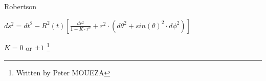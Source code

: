 \documentclass{article}
\date{1st february 1966}
\begin{document}





Robertson



$ds^2 = dt^2-R^2(t)[\frac{dr^2}{1-K \cdot r^2}+r^2 \cdot (d\theta^2+sin(\theta)^2 \cdot d\phi ^2)] \quad$

$K=0$  or  $ \SI{  \pm 1}{ } $
\footnote{Written by Peter MOUEZA}
\end{document}

